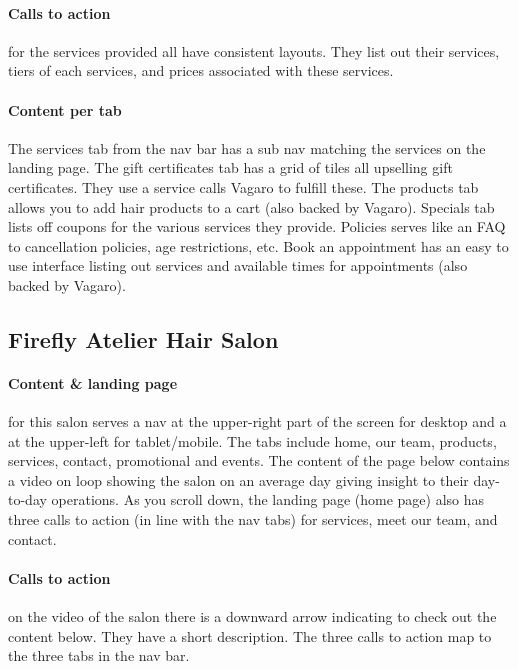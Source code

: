 \paragraph{Calls to action}
for the services provided all have consistent layouts. They list out their services, tiers of each services, and prices associated with these services.

\paragraph{Content per tab}
The services tab from the nav bar has a sub nav matching the services on the landing page. The gift certificates tab has a grid of tiles all upselling gift certificates. They use a service calls Vagaro to fulfill these. The products tab allows you to add hair products to a cart (also backed by Vagaro). Specials tab lists off coupons for the various services they provide. Policies serves like an FAQ to cancellation policies, age restrictions, etc. Book an appointment has an easy to use interface listing out services and available times for appointments (also backed by Vagaro).

\subsection{Firefly Atelier Hair Salon}

\paragraph{Content & landing page}
for this salon serves a nav at the upper-right part of the screen for desktop and a  at the upper-left for tablet/mobile. The tabs include home, our team, products, services, contact, promotional and events. The content of the page below contains a video on loop showing the salon on an average day giving insight to their day-to-day operations. As you scroll down, the landing page (home page) also has three calls to action (in line with the nav tabs) for services, meet our team, and contact.

\paragraph{Calls to action}
on the video of the salon there is a downward arrow indicating to check out the content below. They have a short description. The three calls to action map to the three tabs in the nav bar.

